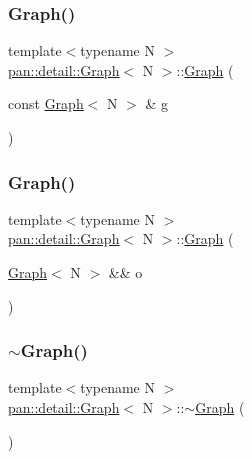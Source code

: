 \subsubsection{\texorpdfstring{Graph()}{Graph()}\hspace{0.1cm}{\footnotesize\ttfamily [3/4]}}
{\footnotesize\ttfamily template$<$typename N $>$ \\
\hyperlink{classpan_1_1detail_1_1_graph}{pan\+::detail\+::\+Graph}$<$ N $>$\+::\hyperlink{classpan_1_1detail_1_1_graph}{Graph} (\begin{DoxyParamCaption}\item[{const \hyperlink{classpan_1_1detail_1_1_graph}{Graph}$<$ N $>$ \&}]{g }\end{DoxyParamCaption})}

\mbox{\label{classpan_1_1detail_1_1_graph_a5103d7c5ead98cac2306d1c3ca482e8e}} 
\subsubsection{\texorpdfstring{Graph()}{Graph()}\hspace{0.1cm}{\footnotesize\ttfamily [4/4]}}
{\footnotesize\ttfamily template$<$typename N $>$ \\
\hyperlink{classpan_1_1detail_1_1_graph}{pan\+::detail\+::\+Graph}$<$ N $>$\+::\hyperlink{classpan_1_1detail_1_1_graph}{Graph} (\begin{DoxyParamCaption}\item[{\hyperlink{classpan_1_1detail_1_1_graph}{Graph}$<$ N $>$ \&\&}]{o }\end{DoxyParamCaption})}

\mbox{\label{classpan_1_1detail_1_1_graph_a08789a6050c651e8ff2f99a390f5ad31}} 
\subsubsection{\texorpdfstring{$\sim$\+Graph()}{~Graph()}}
{\footnotesize\ttfamily template$<$typename N $>$ \\
\hyperlink{classpan_1_1detail_1_1_graph}{pan\+::detail\+::\+Graph}$<$ N $>$\+::$\sim$\hyperlink{classpan_1_1detail_1_1_graph}{Graph} (\begin{DoxyParamCaption}{ }\end{DoxyParamCaption})}



